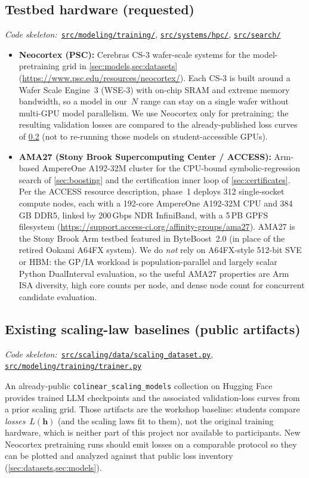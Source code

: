 \documentclass[11pt]{article}
\newcommand{\repoBlob}{https://github.com/krichelj/ByteBoost-Shape-Constrained-Boosted-SR/blob/main/}
\newcommand{\repoTree}{https://github.com/krichelj/ByteBoost-Shape-Constrained-Boosted-SR/tree/main/}
\newcommand{\pyFile}[1]{\href{\repoBlob#1}{\nolinkurl{#1}}}
\newcommand{\pyDir}[1]{\href{\repoTree#1}{\nolinkurl{#1/}}}
\newcommand{\codeRef}[1]{%
  \par\nobreak\noindent
  {\footnotesize\textit{Code skeleton:}~#1}\par\smallskip}
\theoremstyle{plain}
\theoremstyle{remark}
\begin{document}
\subsection{Testbed hardware (requested)}\label{sec:testbeds}
\codeRef{\pyDir{src/modeling/training}, \pyDir{src/systems/hpc}, \pyDir{src/search}}
\begin{itemize}[nosep, leftmargin=1.4em]
 \item \textbf{Neocortex (PSC):} Cerebras CS-3 wafer-scale systems for the model-pretraining grid in \cref{sec:models,sec:datasets}
 (\url{https://www.psc.edu/resources/neocortex/}).
 Each CS-3 is built around a Wafer Scale Engine~3 (WSE-3) with on-chip SRAM and extreme memory bandwidth, so a model in our~$N$ range can stay on a single wafer without multi-GPU model parallelism.
 We use Neocortex only for pretraining; the resulting validation losses are compared to the already-published loss curves of \cref{sec:baselines} (not to re-running those models on student-accessible GPUs).
 \item \textbf{AMA27 (Stony Brook Supercomputing Center / ACCESS):} Arm-based AmpereOne A192-32M cluster for the CPU-bound symbolic-regression search of \cref{sec:boosting} and the certification inner loop of \cref{sec:certificates}.
 Per the ACCESS resource description, phase~1 deploys 312 single-socket compute nodes, each with a 192-core AmpereOne A192-32M CPU and 384\,GB DDR5, linked by 200\,Gbps NDR InfiniBand, with a 5\,PB GPFS filesystem (\url{https://support.access-ci.org/affinity-groups/ama27}).
 AMA27 is the Stony Brook Arm testbed featured in ByteBoost~2.0 (in place of the retired Ookami A64FX system).
 We do \emph{not} rely on A64FX-style 512-bit SVE or HBM: the GP/IA workload is population-parallel and largely scalar Python DualInterval evaluation, so the useful AMA27 properties are Arm ISA diversity, high core counts per node, and dense node count for concurrent candidate evaluation.
\end{itemize}

\subsection{Existing scaling-law baselines (public artifacts)}\label{sec:baselines}
\codeRef{\pyFile{src/scaling/data/scaling_dataset.py}, \pyFile{src/modeling/training/trainer.py}}
An already-public \texttt{colinear\_\allowbreak scaling\_\allowbreak models} collection on Hugging Face~\citep{kricheli2025colinear} provides trained LLM checkpoints and the associated validation-loss curves from a prior scaling grid.
Those artifacts are the workshop baseline: students compare \emph{losses}~$L(\mathbf{h})$ (and the scaling laws fit to them), not the original training hardware, which is neither part of this project nor available to participants.
New Neocortex pretraining runs should emit losses on a comparable protocol so they can be plotted and analyzed against that public loss inventory (\cref{sec:datasets,sec:models}).
\end{document}

